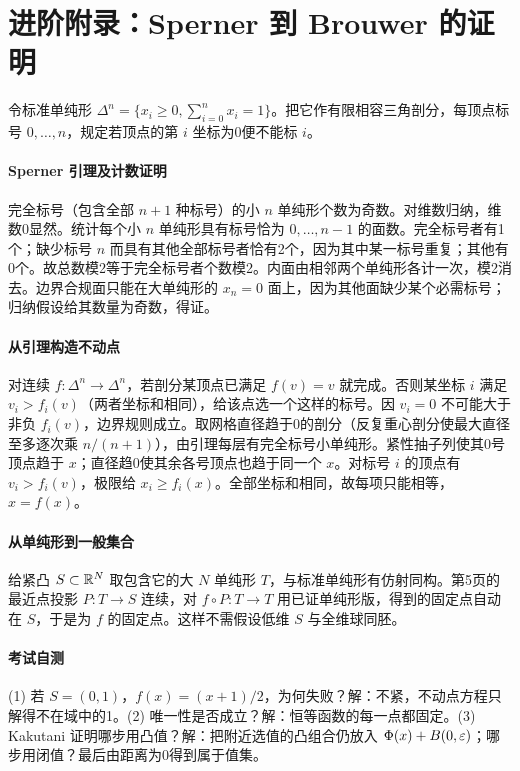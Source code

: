 \clearpage\section*{进阶附录：Sperner 到 Brouwer 的证明}
令标准单纯形 $\Delta^n=\{x_i\ge0,\sum_{i=0}^n x_i=1\}$。把它作有限相容三角剖分，每顶点标号 $0,\ldots,n$，规定若顶点的第 $i$ 坐标为0便不能标 $i$。
\paragraph{Sperner 引理及计数证明} 完全标号（包含全部 $n+1$ 种标号）的小 $n$ 单纯形个数为奇数。对维数归纳，维数0显然。统计每个小 $n$ 单纯形具有标号恰为 $0,\ldots,n-1$ 的面数。完全标号者有1个；缺少标号 $n$ 而具有其他全部标号者恰有2个，因为其中某一标号重复；其他有0个。故总数模2等于完全标号者个数模2。内面由相邻两个单纯形各计一次，模2消去。边界合规面只能在大单纯形的 $x_n=0$ 面上，因为其他面缺少某个必需标号；归纳假设给其数量为奇数，得证。
\paragraph{从引理构造不动点} 对连续 $f:\Delta^n\to\Delta^n$，若剖分某顶点已满足 $f(v)=v$ 就完成。否则某坐标 $i$ 满足 $v_i>f_i(v)$（两者坐标和相同），给该点选一个这样的标号。因 $v_i=0$ 不可能大于非负 $f_i(v)$，边界规则成立。取网格直径趋于0的剖分（反复重心剖分使最大直径至多逐次乘 $n/(n+1)$），由引理每层有完全标号小单纯形。紧性抽子列使其0号顶点趋于 $x$；直径趋0使其余各号顶点也趋于同一个 $x$。对标号 $i$ 的顶点有 $v_i>f_i(v)$，极限给 $x_i\ge f_i(x)$。全部坐标和相同，故每项只能相等，$x=f(x)$。
\paragraph{从单纯形到一般集合} 给紧凸 $S\subset\mathbb{R}^N$ 取包含它的大 $N$ 单纯形 $T$，与标准单纯形有仿射同构。第5页的最近点投影 $P:T\to S$ 连续，对 $f\circ P:T\to T$ 用已证单纯形版，得到的固定点自动在 $S$，于是为 $f$ 的固定点。这样不需假设低维 $S$ 与全维球同胚。
\paragraph{考试自测} (1) 若 $S=(0,1)$，$f(x)=(x+1)/2$，为何失败？解：不紧，不动点方程只解得不在域中的1。(2) 唯一性是否成立？解：恒等函数的每一点都固定。(3) Kakutani 证明哪步用凸值？解：把附近选值的凸组合仍放入 $\Phi(x)+B(0,\varepsilon)$；哪步用闭值？最后由距离为0得到属于值集。
